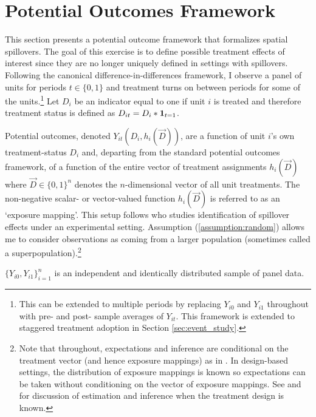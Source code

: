\documentclass[11pt]{article}
\begin{document}
\section{Potential Outcomes Framework}
\label{sec:po_framework}

This section presents a potential outcome framework that formalizes spatial spillovers. The goal of this exercise is to define possible treatment effects of interest since they are no longer uniquely defined in settings with spillovers. Following the canonical difference-in-differences framework, I observe a panel of units for periods $t \in \{0,1\}$ and treatment turns on between periods for some of the units.\footnote{This can be extended to multiple periods by replacing $Y_{i0}$ and $Y_{i1}$ throughout with pre- and post- sample averages of $Y_{it}$. This framework is extended to staggered treatment adoption in Section \ref{sec:event_study}.} Let $D_{i}$ be an indicator equal to one if unit $i$ is treated and therefore treatment status is defined as $D_{it} = D_{i} * \mathbf{1}_{t = 1}$.

Potential outcomes, denoted $Y_{it}(D_i, h_i(\vec{D}))$, are a function of unit $i$'s own treatment-status $D_i$ and, departing from the standard potential outcomes framework, of a function of the entire vector of treatment assignments $h_i(\vec{D})$ where $\vec{D} \in \{0,1 \}^n$ denotes the $n$-dimensional vector of all unit treatments. The non-negative scalar- or vector-valued function $h_i(\vec{D})$ is referred to as an `exposure mapping'. This setup follows \citet{vazquez2022identification} who studies identification of spillover effects under an experimental setting. Assumption (\ref{assumption:random}) allows me to consider observations as coming from a larger population (sometimes called a superpopulation).\footnote{Note that throughout, expectations and inference are conditional on the treatment vector (and hence exposure mappings) as in \citet{Borusyak_Jaravel_Spiess_2021}. In design-based settings, the distribution of exposure mappings is known so expectations can be taken without conditioning on the vector of exposure mappings. See \citet{Savje_Aronow_Hudgens_2021} and \citet{xu2023difference} for discussion of estimation and inference when the treatment design is known.} 

\begin{assumption}\label{assumption:random}
  $\{ Y_{i0}, Y_{i1} \}_{i = 1}^{n}$ is an independent and identically distributed sample of panel data.
\end{assumption}
\end{document}
